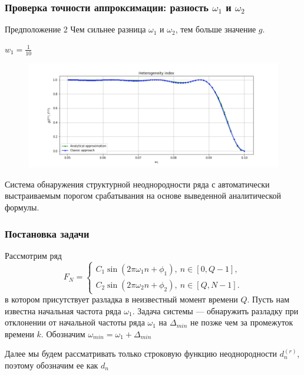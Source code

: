 \documentclass[11pt]{beamer}
\begin{document}
	\begin{frame}
		\frametitle{Проверка точности аппроксимации: разность $ \omega_1 $ и $ \omega_2 $}
		\begin{block}{Предположение 2}
			Чем сильнее разница $ \omega_1 $ и $ \omega_2 $, тем больше значение $ g $.
		\end{block}
		$ w_1 = \frac{1}{10} $
		
		\begin{figure}[b]
			\centering
			\includegraphics[width=\linewidth]{imgs/dynamics_w2}
		\end{figure}
		
	\end{frame}


	\begin{frame}
		\centering
		Система обнаружения структурной неоднородности ряда с автоматически выстраиваемым порогом срабатывания на основе выведенной аналитической формулы.
	\end{frame}

	\begin{frame}
		\frametitle{Постановка задачи}
		Рассмотрим ряд 
		\begin{equation*} 
			F_N = 
			\begin{cases} 
				C_1\sin(2\pi\omega_1 n + \phi_1),\ n \in [0, Q-1], \\ 
				C_2\sin(2\pi\omega_2 n + \phi_2),\ n \in [Q, N-1]. 
			\end{cases} 
		\end{equation*}
	в котором присутствует разладка в неизвестный момент времени $ Q $. Пусть нам известна начальная частота ряда $ \omega_1 $. Задача системы --- обнаружить разладку при отклонении от начальной частоты ряда $ \omega_1 $ на $ \Delta_{min} $ не позже чем за промежуток времени $ k $. Обозначим $ \omega_{min} = \omega_1 + \Delta_{min} $
	
	\bigskip
	Далее мы будем рассматривать только строковую функцию неоднородности $ d_n^{(r)} $, поэтому обозначим ее как $ d_n $
	\end{frame}
\end{document}
